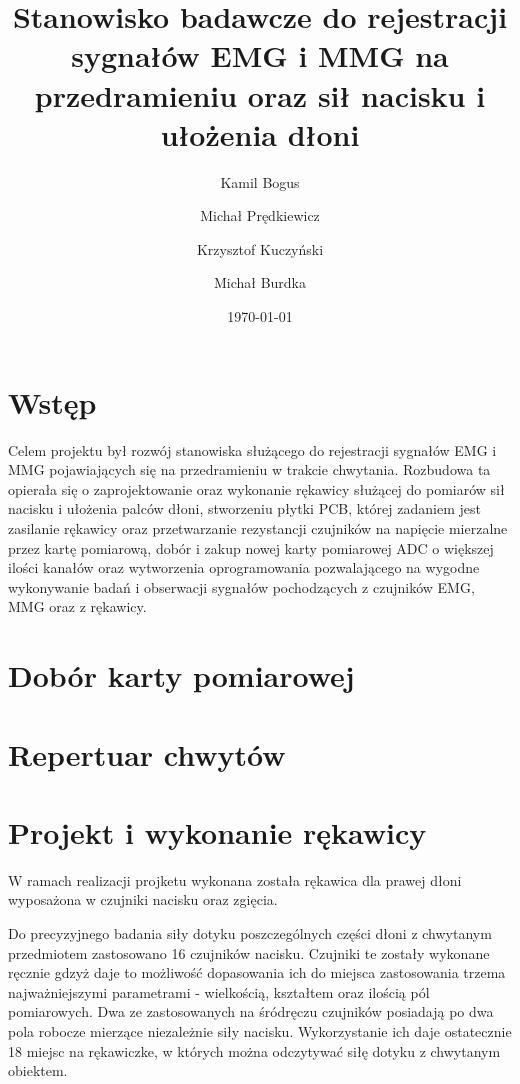 \documentclass[10pt, a4paper]{article}
\author{Kamil Bogus
\and 
Michał Prędkiewicz
\and
Krzysztof Kuczyński
\and
Michał Burdka
}
\title{Stanowisko badawcze do rejestracji sygnałów EMG i MMG na przedramieniu oraz sił nacisku i ułożenia dłoni}
\date{\today}
\begin{document}
\maketitle %
%
\def\tablename{Tabela}
%

\section{Wstęp}
\label{sec:wstep} %
%
Celem projektu był rozwój stanowiska służącego do rejestracji sygnałów EMG i MMG pojawiających się na przedramieniu w trakcie chwytania. Rozbudowa ta opierała się o zaprojektowanie oraz wykonanie rękawicy służącej do pomiarów sił nacisku i ułożenia palców dłoni, stworzeniu płytki PCB, której zadaniem jest zasilanie rękawicy oraz przetwarzanie rezystancji czujników na napięcie mierzalne przez kartę pomiarową, dobór i zakup nowej karty pomiarowej ADC o większej ilości kanałów oraz wytworzenia oprogramowania pozwalającego na wygodne wykonywanie badań i obserwacji sygnałów pochodzących z czujników EMG, MMG oraz z rękawicy.

\section{Dobór karty pomiarowej}
\label{sec:karta}



\section{Repertuar chwytów}
\label{sec:chwyty}


\section{Projekt i wykonanie rękawicy}
\label{sec:rekawica}
W ramach realizacji projketu wykonana została rękawica dla prawej dłoni wyposażona w czujniki nacisku oraz zgięcia.

Do precyzyjnego badania siły dotyku poszczególnych części dłoni z chwytanym przedmiotem zastosowano 16 czujników nacisku. Czujniki te zostały wykonane ręcznie gdzyż daje to możliwość dopasowania ich do miejsca zastosowania trzema najważniejszymi parametrami - wielkością, kształtem oraz ilością pól pomiarowych. Dwa ze zastosowanych na śródręczu czujników posiadają po dwa pola robocze mierzące niezależnie siły nacisku. Wykorzystanie ich daje ostatecznie 18 miejsc na rękawiczke, w których można odczytywać siłę dotyku z chwytanym obiektem. 
\end{document}
